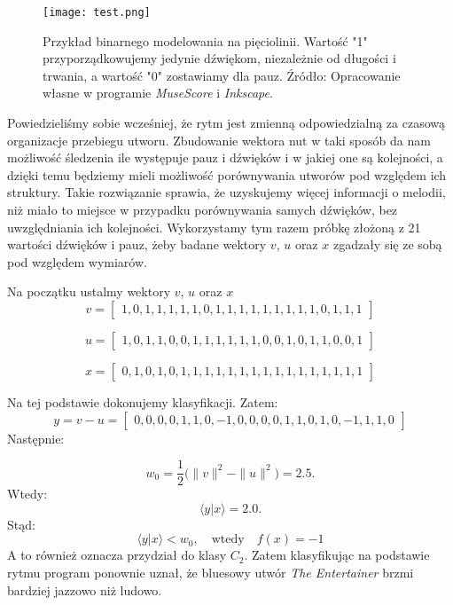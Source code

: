 \begin{figure}[H]
\texttt{[image: test.png]}
\centering
\caption{Przykład binarnego modelowania na pięciolinii. Wartość "1" przyporządkowujemy jedynie dźwiękom, niezależnie od długości i trwania, a wartość "0" zostawiamy dla pauz. Źródło: Opracowanie własne w programie \textit{MuseScore} i \textit{Inkscape}.}
\centering
\end{figure}

Powiedzieliśmy sobie wcześniej, że rytm jest zmienną odpowiedzialną za czasową organizacje przebiegu utworu. Zbudowanie wektora nut w taki sposób da nam możliwość śledzenia ile występuje pauz i dźwięków i w jakiej one są kolejności, a dzięki temu będziemy mieli możliwość porównywania utworów pod względem ich struktury. Takie rozwiązanie sprawia, że uzyskujemy więcej informacji o melodii, niż miało to miejsce w przypadku porównywania samych dźwięków, bez uwzględniania ich kolejności.
Wykorzystamy tym razem próbkę złożoną z 21 wartości dźwięków i pauz, żeby badane wektory $v$, $u$ oraz $x$ zgadzały się ze sobą pod względem wymiarów.

Na początku ustalmy wektory $v$, $u$ oraz $x$
\begin{equation*}
    v = 
    \begin{bmatrix}
    1,0,1,1,1,1,1,0,1,1,1,1,1,1,1,1,1,0,1,1,1
    \end{bmatrix}
\end{equation*}

\begin{equation*}
    u =
    \begin{bmatrix}
    1,0,1,1,0,0,1,1,1,1,1,1,0,0,1,0,1,1,0,0,1
    \end{bmatrix}
\end{equation*}

\begin{equation*}
    x =
    \begin{bmatrix}
    0,1,0,1,0,1,1,1,1,1,1,1,1,1,1,1,1,1,1,1,1
    \end{bmatrix}
\end{equation*}

Na tej podstawie dokonujemy klasyfikacji.
Zatem:
\begin{equation*}
    y = v - u =
    \begin{bmatrix}
    0,0,0,0,1,1,0,-1,0,0,0,0,1,1,0,1,0,-1,1,1,0
    \end{bmatrix}
\end{equation*}
Następnie:

\begin{equation*}
w_{0} =\frac{1}{2} \big(\|v\|^{2} - \|u\|^{2}\big) = 2.5.
\end{equation*}
Wtedy:
\begin{equation*}
\big \langle y|x  \big \rangle = 2.0.
\end{equation*}
Stąd:
\begin{equation*}
    \big \langle y|x \big \rangle < w_{0}, \quad \text{wtedy} \quad f(x) = -1
\end{equation*}
A to również oznacza przydział do klasy $C_{2}$.
Zatem klasyfikując na podstawie rytmu program ponownie uznał, że bluesowy utwór \textit{The Entertainer} brzmi bardziej jazzowo niż ludowo.

